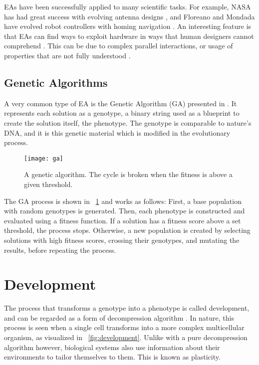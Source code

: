 EAs have been successfully applied to many scientific tasks.
For example, NASA has had great success with evolving antenna designs \cite{hornby2006antenna}, and Floreano and Mondada have evolved robot controllers with homing navigation \cite{floreano1996evolution}.
An interesting feature is that EAs can find ways to exploit hardware in ways that human designers cannot comprehend \cite{thompson1997evolved}.
This can be due to complex parallel interactions, or usage of properties that are not fully understood \cite{thompson1999analysis}.

\subsection{Genetic Algorithms}

A very common type of EA is the Genetic Algorithm (GA) presented in \cite{golberg1989ga}.
It represents each solution as a genotype, a binary string used as a blueprint to create the solution itself, the phenotype.
The genotype is comparable to nature's DNA, and it is this genetic material which is modified in the evolutionary process.

\begin{figure}[!ht]
    \centering
    \texttt{[image: ga]}
    \caption[Genetic algorithm]{
        A genetic algorithm.
        The cycle is broken when the fitness is above a given threshold.
    }
    \label{fig:ga}
\end{figure}

The GA process is shown in \figurename~\ref{fig:ga} and works as follows:
First, a base population with random genotypes is generated.
Then, each phenotype is constructed and evaluated using a fitness function.
If a solution has a fitness score above a set threshold, the process stops.
Otherwise, a new population is created by selecting solutions with high fitness scores, crossing their genotypes, and mutating the results, before repeating the process.


\section{Development}

The process that transforms a genotype into a phenotype is called development, and can be regarded as a form of decompression algorithm \cite{harding2008artificial}.
In nature, this process is seen when a single cell transforms into a more complex multicellular organism, as visualized in \figurename~\ref{fig:development}.
Unlike with a pure decompression algorithm however, biological systems also use information about their environments to tailor themselves to them.
This is known as plasticity.

